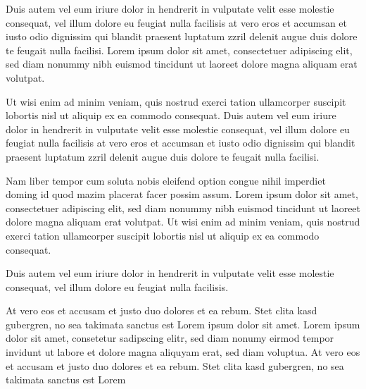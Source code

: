\documentclass[]{../metanetpaper}
\begin{document}
\begin{Parallel}[c]{80mm}{80mm}
{    Duis autem vel eum iriure dolor in hendrerit in vulputate velit esse molestie consequat, vel illum dolore eu feugiat nulla facilisis at vero eros et accumsan et iusto odio dignissim qui blandit praesent luptatum zzril delenit augue duis dolore te feugait nulla facilisi. Lorem ipsum dolor sit amet, consectetuer adipiscing elit, sed diam nonummy nibh euismod tincidunt ut laoreet dolore magna aliquam erat volutpat.   

    Ut wisi enim ad minim veniam, quis nostrud exerci tation ullamcorper suscipit lobortis nisl ut aliquip ex ea commodo consequat. Duis autem vel eum iriure dolor in hendrerit in vulputate velit esse molestie consequat, vel illum dolore eu feugiat nulla facilisis at vero eros et accumsan et iusto odio dignissim qui blandit praesent luptatum zzril delenit augue duis dolore te feugait nulla facilisi.   

    Nam liber tempor cum soluta nobis eleifend option congue nihil imperdiet doming id quod mazim placerat facer possim assum. Lorem ipsum dolor sit amet, consectetuer adipiscing elit, sed diam nonummy nibh euismod tincidunt ut laoreet dolore magna aliquam erat volutpat. Ut wisi enim ad minim veniam, quis nostrud exerci tation ullamcorper suscipit lobortis nisl ut aliquip ex ea commodo consequat.   

    Duis autem vel eum iriure dolor in hendrerit in vulputate velit esse molestie consequat, vel illum dolore eu feugiat nulla facilisis.   

    At vero eos et accusam et justo duo dolores et ea rebum. Stet clita kasd gubergren, no sea takimata sanctus est Lorem ipsum dolor sit amet. Lorem ipsum dolor sit amet, consetetur sadipscing elitr, sed diam nonumy eirmod tempor invidunt ut labore et dolore magna aliquyam erat, sed diam voluptua. At vero eos et accusam et justo duo dolores et ea rebum. Stet clita kasd gubergren, no sea takimata sanctus est Lorem
  }

\end{Parallel}
\end{document}
